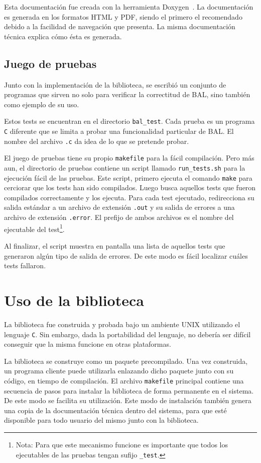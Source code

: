 \documentclass{cacic06}
\begin{document}
Esta documentación fue creada con la herramienta Doxygen~\cite{doxygen}. 
 La documentación es generada en los formatos HTML y PDF, siendo el primero el recomendado debido a la facilidad de navegación que presenta.
 La misma documentación técnica explica cómo ésta es generada.

\subsection{Juego de pruebas}
Junto con la implementación de la biblioteca, se escribió un conjunto de programas que sirven no solo para verificar la correctitud de BAL, sino también como ejemplo de su uso.

Estos tests se encuentran en el directorio \texttt{bal\_test}. Cada prueba es un programa \texttt{C} diferente que se limita a probar una funcionalidad particular de BAL. El nombre del archivo \texttt{.c} da idea de lo que se pretende probar.

El juego de pruebas tiene su propio \texttt{makefile} para la fácil compilación. Pero más aun, el directorio de pruebas contiene un script llamado \texttt{run\_tests.sh} para la ejecución fácil de las pruebas. Este script, primero ejecuta el comando \texttt{make} para cerciorar que los tests han sido compilados. Luego busca aquellos tests que fueron compilados correctamente y los ejecuta. Para cada test ejecutado, redirecciona su salida estándar a un archivo de extensión \texttt{.out} y su salida de errores a una archivo de extensión \texttt{.error}. El prefijo de ambos archivos es el nombre del ejecutable del test\footnote{Nota: Para que este mecanismo funcione es importante que todos los ejecutables de las pruebas tengan sufijo \texttt{\_test}.}.

Al finalizar, el script muestra en pantalla una lista de aquellos tests que generaron algún tipo de salida  de errores. De este modo es fácil localizar cuáles tests fallaron.

\section{Uso de la biblioteca}
\label{sec_uso}
La biblioteca fue construida y probada bajo un ambiente UNIX utilizando el lenguaje \texttt{C}. Sin embargo, dada la portabilidad del lenguaje, no debería ser difícil conseguir que la misma funcione en otras plataformas.

La biblioteca se construye como un paquete precompilado. Una vez construida, un programa cliente puede utilizarla enlazando dicho paquete junto con su código, en tiempo de compilación.
El archivo \texttt{makefile} principal contiene una secuencia de pasos para instalar la biblioteca de forma permanente en el sistema. De este modo se facilita su utilización. Este modo de instalación también genera una copia de la documentación técnica dentro del sistema, para que esté disponible para todo usuario del mismo junto con la biblioteca.
\end{document}
